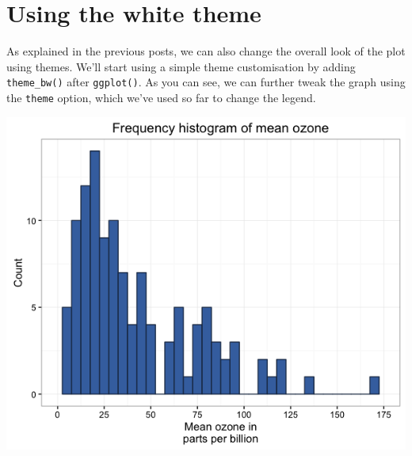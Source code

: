 \section{Using the white theme}\label{using-the-white-theme-6}

As explained in the previous posts, we can also change the overall look
of the plot using themes. We'll start using a simple theme customisation
by adding \texttt{theme\_bw()} after \texttt{ggplot()}. As you can see,
we can further tweak the graph using the \texttt{theme} option, which
we've used so far to change the legend.

\begin{Shaded}
\begin{Highlighting}[]

\StringTok{ }\NormalTok{(} \StringTok{ }
\StringTok{      }\NormalTok{(}\NormalTok{(}  \NormalTok{,}
\StringTok{        }  
\StringTok{      }\NormalTok{(} \NormalTok{,}
\StringTok{        } \NormalTok{(}\NormalTok{, }\NormalTok{, }\NormalTok{),}
\StringTok{        }\NormalTok{(}\NormalTok{, }\NormalTok{)) +}
\StringTok{      }\NormalTok{(} \NormalTok{) +}
\StringTok{      }\NormalTok{(}\NormalTok{) +}
\StringTok{      }\NormalTok{()}
\end{Highlighting}
\end{Shaded}

\begin{center}\includegraphics[width=0.55\linewidth]{0_all_posts_pdf/histogram_13-1} \end{center}

